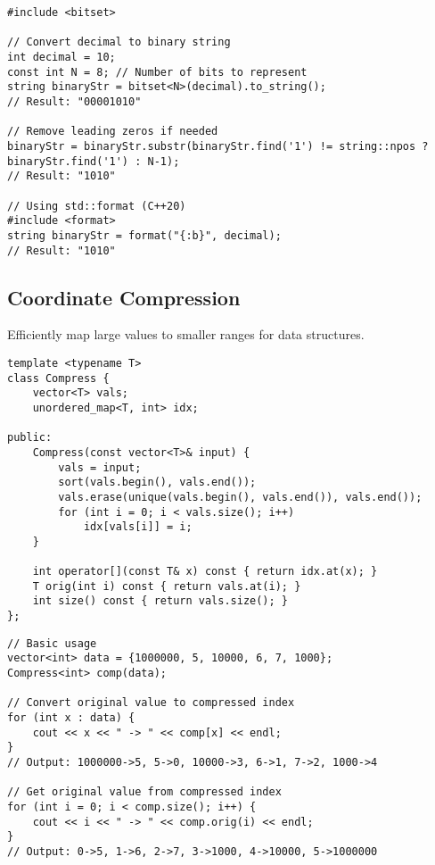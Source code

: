 \documentclass[11pt,a4paper]{article}
\begin{document}
\begin{lstlisting}[caption={Decimal to Binary Conversion}]
#include <bitset>

// Convert decimal to binary string
int decimal = 10;
const int N = 8; // Number of bits to represent
string binaryStr = bitset<N>(decimal).to_string();
// Result: "00001010"

// Remove leading zeros if needed
binaryStr = binaryStr.substr(binaryStr.find('1') != string::npos ? binaryStr.find('1') : N-1);
// Result: "1010"

// Using std::format (C++20)
#include <format>
string binaryStr = format("{:b}", decimal);
// Result: "1010"
\end{lstlisting}



\newpage

\subsection{Coordinate Compression}
Efficiently map large values to smaller ranges for data structures.

\begin{lstlisting}[caption={Coordinate Compression Template}]
template <typename T>
class Compress {
    vector<T> vals;
    unordered_map<T, int> idx;

public:
    Compress(const vector<T>& input) {
        vals = input;
        sort(vals.begin(), vals.end());
        vals.erase(unique(vals.begin(), vals.end()), vals.end());
        for (int i = 0; i < vals.size(); i++)
            idx[vals[i]] = i;
    }

    int operator[](const T& x) const { return idx.at(x); }
    T orig(int i) const { return vals.at(i); }
    int size() const { return vals.size(); }
};
\end{lstlisting}

\begin{lstlisting}[caption={Coordinate Compression Example}]
// Basic usage
vector<int> data = {1000000, 5, 10000, 6, 7, 1000};
Compress<int> comp(data);

// Convert original value to compressed index
for (int x : data) {
    cout << x << " -> " << comp[x] << endl;
}
// Output: 1000000->5, 5->0, 10000->3, 6->1, 7->2, 1000->4

// Get original value from compressed index
for (int i = 0; i < comp.size(); i++) {
    cout << i << " -> " << comp.orig(i) << endl;
}
// Output: 0->5, 1->6, 2->7, 3->1000, 4->10000, 5->1000000
\end{lstlisting}
\end{document}
